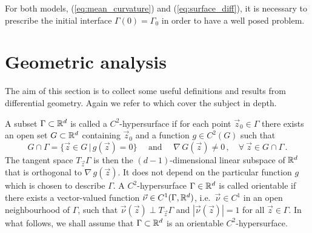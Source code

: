 For both models, (\ref{eq:mean_curvature}) and (\ref{eq:surface_diff}), it is
necessary to prescribe the initial interface $\Gamma(0)=\Gamma_0$ in order to
have a well posed problem.

\section{Geometric analysis}\label{sec:geometric_analysis}
The aim of this section is to collect some useful definitions and results from
differential geometry. Again we refer to \cite{DeckelnickDE05} which cover the
subject in depth.

A subset $\Gamma \subset {\mathbb R}^d$ is called a $C^2$-hypersurface if for each point
$\vec z_0 \in \Gamma$ there exists an open set $G \subset {\mathbb R}^d$ containing
$\vec z_0$ and a function $g \in C^2(G)$ such that
\begin{equation}
G \cap \Gamma = \{ \vec z \in G \, | \, g(\vec z) = 0 \}
\quad \mbox{ and } \quad \nabla \, G(\vec z) \neq 0\,,
\quad \forall\ \vec z \in G \cap \Gamma \, .
\end{equation}
The tangent space $T_{\vec z} \Gamma$ is then the $(d-1)$-dimensional linear
subspace of ${\mathbb R}^d$ that is orthogonal to $\nabla \, g(\vec z)$. It does not
depend on the particular function $g$ which is chosen to describe $\Gamma$. A
$C^2$-hypersurface $\Gamma \in {\mathbb R}^d$ is called orientable if there exists a
vector-valued function $\vec\nu \in C^1(\Gamma, {\mathbb R}^d)$, i.e.~$\vec\nu \in C^1$
in an open neighbourhood of $\Gamma$, such that $\vec\nu(\vec z) \perp T_{\vec
z} \Gamma$ and $|\vec{\nu}(\vec z)| = 1$ for all $\vec z \in \Gamma$. In what
follows, we shall assume that $\Gamma \subset {\mathbb R}^d$ is an orientable
$C^2$-hypersurface.


